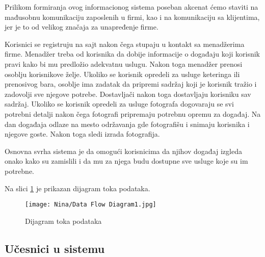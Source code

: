 \documentclass[a4paper]{article}
\begin{document}
Prilikom formiranja ovog informacionog sistema poseban akcenat ćemo staviti na mađusobnu komunikaciju zaposlenih u firmi, kao i na komunikaciju sa klijentima, jer je to od velikog značaja za unapređenje firme.
    
Korisnici se registruju na sajt nakon čega stupaju u kontakt sa menadžerima firme. Menadžer treba od korisnika da dobije informacije o događaju koji korisnik pravi kako bi mu predložio adekvatnu uslugu. Nakon toga menadžer prenosi osoblju korisnikove želje. 
Ukoliko se korisnik opredeli za usluge keteringa ili prenosivog bara, osoblje ima zadatak da pripremi sadržaj koji je korisnik tražio i zadovolji sve njegove potrebe. Dostavljači nakon toga dostavljaju korisniku sav sadržaj.
Ukoliko se korisnik opredeli za usluge fotografa dogovaraju se svi potrebni detalji nakon čega fotografi pripremaju potrebnu opremu za događaj. Na dan događaja odlaze na mesto održavanja gde fotografišu i snimaju korisnika i njegove goste. Nakon toga sledi izrada fotografija. 
    
Osnovna svrha sistema je da omogući korisnicima da njihov događaj izgleda onako kako su zamislili i da mu za njega budu dostupne sve usluge koje su im potrebne. 

Na slici \ref{fig:Tok} je prikazan dijagram toka podataka.
    
    \begin{figure}[H]
    \centering
    \texttt{[image: Nina/Data Flow Diagram1.jpg]}
    \caption{Dijagram toka podataka}
    \label{fig:Tok}
\end{figure}
    
    \subsection{Učesnici u sistemu}
    
\end{document}
